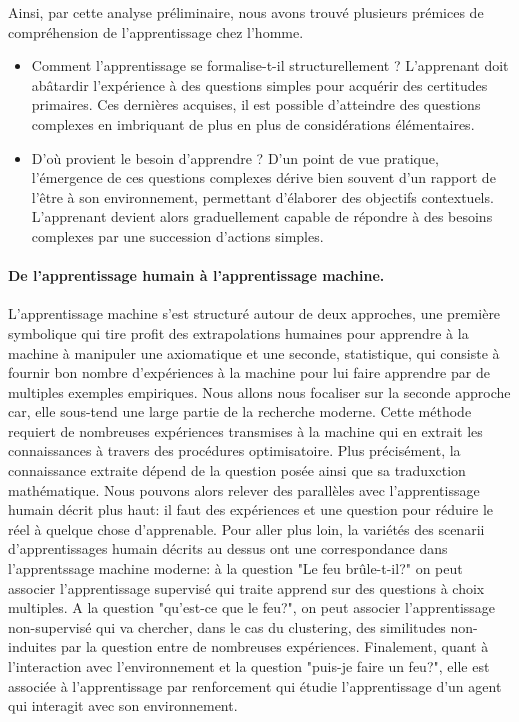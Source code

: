 Ainsi, par cette analyse préliminaire, nous avons trouvé plusieurs prémices de compréhension de l'apprentissage chez l'homme.
    \begin{itemize}
        \item Comment l'apprentissage se formalise-t-il structurellement ?
        L'apprenant doit abâtardir l'expérience à des questions simples pour acquérir des certitudes primaires. Ces dernières acquises, il est possible d'atteindre des questions complexes en imbriquant de plus en plus de considérations élémentaires. 
        \item D'où provient le besoin d'apprendre ? D'un point de vue pratique, l'émergence de ces questions complexes dérive bien souvent d'un rapport de l'être à son environnement, permettant d'élaborer des objectifs contextuels. L'apprenant devient alors graduellement capable de répondre à des besoins complexes par une succession d'actions simples.
    \end{itemize}

\paragraph{De l'apprentissage humain à l'apprentissage machine.}
    L'apprentissage machine s'est structuré autour de deux approches, une première symbolique qui tire profit des extrapolations humaines pour apprendre à la machine à manipuler une axiomatique et une seconde, statistique, qui consiste à fournir bon nombre d'expériences à la machine pour lui faire apprendre par de multiples exemples empiriques. Nous allons nous focaliser sur la seconde approche car, elle sous-tend une large partie de la recherche moderne.
    Cette méthode requiert de nombreuses expériences transmises à la machine qui en extrait les connaissances à travers des procédures optimisatoire. Plus précisément, la connaissance extraite dépend de la question posée ainsi que sa traduxction mathématique. Nous pouvons alors relever des parallèles avec l'apprentissage humain décrit plus haut: il faut des expériences et une question pour réduire le réel à quelque chose d'apprenable. Pour aller plus loin, la variétés des scenarii d'apprentissages humain décrits au dessus ont une correspondance dans l'apprentssage machine moderne: à la question "Le feu brûle-t-il?" on peut associer l'apprentissage supervisé qui traite apprend sur des questions à choix multiples. A la question "qu'est-ce que le feu?", on peut associer l'apprentissage non-supervisé qui va chercher, dans le cas du clustering, des similitudes non-induites par la question entre de nombreuses expériences. Finalement, quant à l'interaction avec l'environnement et la question "puis-je faire un feu?", elle est associée à l'apprentissage par renforcement qui étudie l'apprentissage d'un agent qui interagit avec son environnement. 
    
